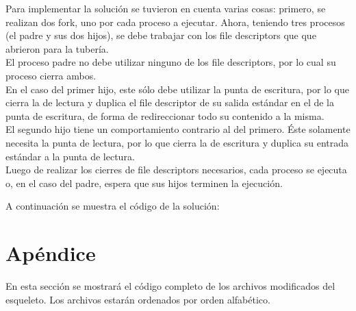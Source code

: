 \documentclass[a4paper, 12pt]{article}
\begin{document}
		Para implementar la solución se tuvieron en cuenta varias cosas: primero, se realizan dos fork, uno por cada proceso a ejecutar. Ahora, teniendo tres procesos (el padre y sus dos hijos), se debe trabajar con los file descriptors que que abrieron para la tubería.\\
		El proceso padre no debe utilizar ninguno de los file descriptors, por lo cual su proceso cierra ambos. \\
		En el caso del primer hijo, este sólo debe utilizar la punta de escritura, por lo que cierra la de lectura y duplica el file descriptor de su salida estándar en el de la punta de escritura, de forma de redireccionar todo su contenido a la misma.\\
		El segundo hijo tiene un comportamiento contrario al del primero. Éste solamente necesita la punta de lectura, por lo que cierra la de escritura y duplica su entrada estándar a la punta de lectura.\\
		Luego de realizar los cierres de file descriptors necesarios, cada proceso se ejecuta o, en el caso del padre, espera que sus hijos terminen la ejecución.
		
		A continuación se muestra el código de la solución:\\
		
	
		
	\newpage
	\section{Apéndice}
	En esta sección se mostrará el código completo de los archivos modificados del esqueleto. Los archivos estarán ordenados por orden alfabético.\\
	
	
	\bigskip\bigskip\bigskip
	
	
	
			
\end{document}
